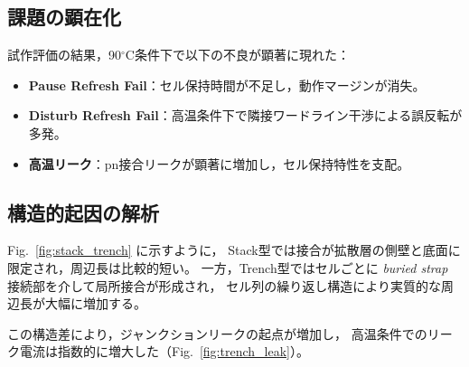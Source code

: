 \documentclass[conference]{IEEEtran}
\begin{document}
\subsection{課題の顕在化}
試作評価の結果，90$^\circ$C条件下で以下の不良が顕著に現れた：
\begin{itemize}
  \item \textbf{Pause Refresh Fail}：セル保持時間が不足し，動作マージンが消失。
  \item \textbf{Disturb Refresh Fail}：高温条件下で隣接ワードライン干渉による誤反転が多発。
  \item \textbf{高温リーク}：pn接合リークが顕著に増加し，セル保持特性を支配。
\end{itemize}

\subsection{構造的起因の解析}
Fig.~\ref{fig:stack_trench} に示すように，  
Stack型では接合が拡散層の側壁と底面に限定され，周辺長は比較的短い。  
一方，Trench型ではセルごとに \emph{buried strap} 接続部を介して局所接合が形成され，  
セル列の繰り返し構造により実質的な周辺長が大幅に増加する。  

この構造差により，ジャンクションリークの起点が増加し，  
高温条件でのリーク電流は指数的に増大した（Fig.~\ref{fig:trench_leak}）。  
\end{document}
